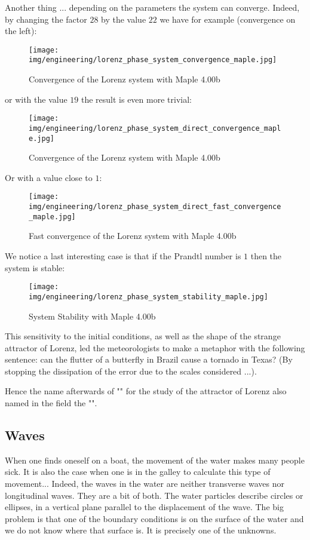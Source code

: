 	Another thing ... depending on the parameters the system can converge. Indeed, by changing the factor $28$ by the value $22$ we have for example (convergence on the left):
	\begin{figure}[H]
		\centering
		\texttt{[image: img/engineering/lorenz\_phase\_system\_convergence\_maple.jpg]}	
		\caption[]{Convergence of the Lorenz system with Maple 4.00b}
	\end{figure}
	or with the value $19$ the result is even more trivial:
	\begin{figure}[H]
		\centering
		\texttt{[image: img/engineering/lorenz\_phase\_system\_direct\_convergence\_maple.jpg]}	
		\caption[]{Convergence of the Lorenz system with Maple 4.00b}
	\end{figure}
	Or with a value close to $1$:
	\begin{figure}[H]
		\centering
		\texttt{[image: img/engineering/lorenz\_phase\_system\_direct\_fast\_convergence\_maple.jpg]}	
		\caption[]{Fast convergence of the Lorenz system with Maple 4.00b}
	\end{figure}
	We notice a last interesting case is that if the Prandtl number is $1$ then the system is stable:
	\begin{figure}[H]
		\centering
		\texttt{[image: img/engineering/lorenz\_phase\_system\_stability\_maple.jpg]}	
		\caption[]{System Stability with Maple 4.00b}
	\end{figure}
	This sensitivity to the initial conditions, as well as the shape of the strange attractor of Lorenz, led the meteorologists to make a metaphor with the following sentence: can the flutter of a butterfly in Brazil cause a tornado in Texas? (By stopping the dissipation of the error due to the scales considered ...).

	Hence the name afterwards of "" for the study of the attractor of Lorenz also named in the field the "".
	
	\pagebreak
	\subsection{Waves}
	When one finds oneself on a boat, the movement of the water makes many people sick. It is also the case when one is in the galley to calculate this type of movement... Indeed, the waves in the water are neither transverse waves nor longitudinal waves. They are a bit of both. The water particles describe circles or ellipses, in a vertical plane parallel to the displacement of the wave. The big problem is that one of the boundary conditions is on the surface of the water and we do not know where that surface is. It is precisely one of the unknowns.

